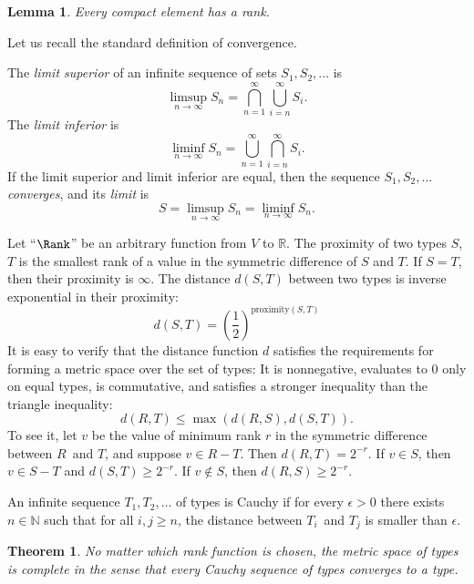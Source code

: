 \documentclass{amsart}
\newtheorem{theorem}[subsection]{Theorem}
\newtheorem{lemma}[subsection]{Lemma}
\begin{document}

\begin{lemma}
Every compact element has a rank.
\end{lemma}

Let us recall the standard definition of convergence.

The \emph{limit superior} of an infinite sequence of sets
$S_1,S_2,\ldots$ is
\[
\limsup_{n\rightarrow\infty}S_n =
\bigcap_{n=1}^\infty\bigcup_{i = n}^\infty S_i.
\]
The \emph{limit inferior} is
\[
\liminf_{n\rightarrow\infty}S_n =
\bigcup_{n=1}^\infty\bigcap_{i = n}^\infty S_i.
\]
If the limit superior and limit inferior are equal, then the
sequence $S_1,S_2,\ldots$ \emph{converges}, and its \emph{limit}
is
\[
S = \limsup_{n\rightarrow\infty}S_n = \liminf_{n\rightarrow\infty}S_n.
\]


Let ``$\Rank$'' be an arbitrary function from $V$ to $\mathbb R$.
The proximity of two types $S$, $T$ is the smallest rank of a
value in the symmetric difference of $S$ and $T$. If $S=T$, then
their proximity is $\infty$. The distance $d(S, T)$ between two
types is inverse exponential in their proximity:
\[
d(S,T) =
\left(\frac12\right)^{\mathrm{proximity}(S, T)}
 \]
It is easy to verify that the distance function $d$ satisfies the
requirements for forming a metric space over the set of types:
It is nonnegative, evaluates to $0$ only on equal types, is
commutative, and satisfies a stronger inequality than the
triangle inequality:
\[
d(R,T)\le\max(d(R,S),d(S,T)).
\]
To see it, let $v$ be the value of minimum rank $r$ in the
symmetric difference between $R$~and $T$, and suppose $v\in R-T$.
Then $d(R, T)=2^{-r}$. If $v\in S$, then $v\in S-T$ and
$d(S,T)\ge2^{-r}$. If $v\notin S$, then $d(R, S)\ge2^{-r}$.


An infinite sequence $T_1,T_2,\ldots$ of types is Cauchy if for
every $\epsilon > 0$ there exists $n\in\mathbb N$ such that for
all $i,j\ge n$, the distance between $T_i$~and $T_j$ is smaller
than $\epsilon$.

\begin{theorem}
No matter which rank function is chosen, the metric space of
types is complete in the sense that every Cauchy sequence of
types converges to a type.
\end{theorem}
\end{document}
